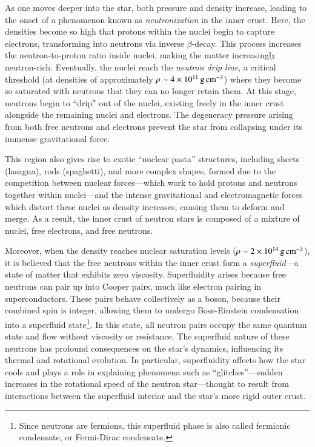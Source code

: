 \documentclass[main.tex]{subfiles}
\begin{document}
    As one moves deeper into the star, both pressure and density increase, leading to the onset of a phenomenon known as \textit{neutronization} in the inner crust. Here, the densities become so high that protons within the nuclei begin to capture electrons, transforming into neutrons via inverse $\beta$-decay. This process increases the neutron-to-proton ratio inside nuclei, making the matter increasingly neutron-rich. Eventually, the nuclei reach the \textit{neutron drip line}, a critical threshold (at densities of approximately $\rho \sim 4 \times 10^{11}\,\rm g\,cm^{-3}$) where they become so saturated with neutrons that they can no longer retain them. At this stage, neutrons begin to ``drip'' out of the nuclei, existing freely in the inner crust alongside the remaining nuclei and electrons. The degeneracy pressure arising from both free neutrons and electrons prevent the star from collapsing under its immense gravitational force.
    
    This region also gives rise to exotic ``nuclear pasta'' structures, including sheets (lasagna), rods (spaghetti), and more complex shapes, formed due to the competition between nuclear forces---which work to hold protons and neutrons together within nuclei---and the intense gravitational and electromagnetic forces which distort these nuclei as density increases, causing them to deform and merge. As a result, the inner crust of neutron stars is composed of a mixture of nuclei, free electrons, and free neutrons.

    Moreover, when the density reaches nuclear saturation levels ($\rho \sim 2 \times 10^{14}\,\rm g\,cm^{-3}$), it is believed that the free neutrons within the inner crust form a \textit{superfluid}---a state of matter that exhibits zero viscosity. 
    Superfluidity arises because free neutrons can pair up into Cooper pairs, much like electron pairing in superconductors. These pairs behave collectively as a boson, because their combined spin is integer, allowing them to undergo Bose-Einstein condensation into a superfluid state\footnote{Since neutrons are fermions, this superfluid phase is also called fermionic condensate, or Fermi-Dirac condensate.}. In this state, all neutron pairs occupy the same quantum state and flow without viscosity or resistance.
    The superfluid nature of these neutrons has profound consequences on the star's dynamics, influencing its thermal and rotational evolution. In particular, superfluidity affects how the star cools and plays a role in explaining phenomena such as ``glitches''---sudden increases in the rotational speed of the neutron star---thought to result from interactions between the superfluid interior and the star's more rigid outer crust.
\end{document}
